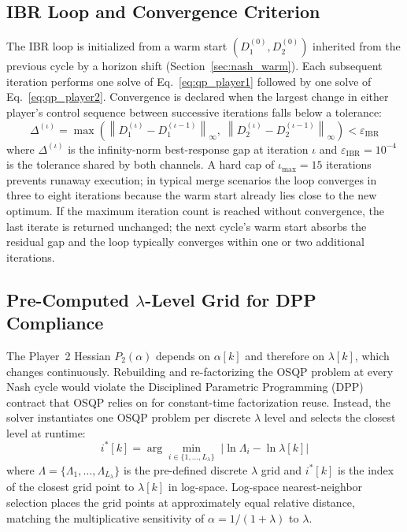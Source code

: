 \documentclass[12pt,a4paper,oneside]{report}
\begin{document}
\subsection{IBR Loop and Convergence Criterion}
\label{sec:ibr_loop}

The IBR loop is initialized from a warm start $(D_1^{(0)}, D_2^{(0)})$ inherited from the previous cycle by a horizon shift (Section~\ref{sec:nash_warm}). Each subsequent iteration performs one solve of Eq.~\eqref{eq:qp_player1} followed by one solve of Eq.~\eqref{eq:qp_player2}. Convergence is declared when the largest change in either player's control sequence between successive iterations falls below a tolerance:
\begin{equation}
\Delta^{(\iota)} = \max\!\left( \left\| D_1^{(\iota)} - D_1^{(\iota-1)} \right\|_{\infty}, \; \left\| D_2^{(\iota)} - D_2^{(\iota-1)} \right\|_{\infty} \right) < \varepsilon_{\text{IBR}}
\label{eq:ibr_convergence}
\end{equation}
where $\Delta^{(\iota)}$ is the infinity-norm best-response gap at iteration $\iota$ and $\varepsilon_{\text{IBR}} = 10^{-4}$ is the tolerance shared by both channels. A hard cap of $\iota_{\max} = 15$ iterations prevents runaway execution; in typical merge scenarios the loop converges in three to eight iterations because the warm start already lies close to the new optimum. If the maximum iteration count is reached without convergence, the last iterate is returned unchanged; the next cycle's warm start absorbs the residual gap and the loop typically converges within one or two additional iterations.

\subsection{Pre-Computed $\lambda$-Level Grid for DPP Compliance}
\label{sec:precomputed_grid}

The Player~2 Hessian $P_2(\alpha)$ depends on $\alpha[k]$ and therefore on $\lambda[k]$, which changes continuously. Rebuilding and re-factorizing the OSQP problem at every Nash cycle would violate the Disciplined Parametric Programming (DPP) contract that OSQP relies on for constant-time factorization reuse. Instead, the solver instantiates one OSQP problem per discrete $\lambda$ level and selects the closest level at runtime:
\begin{equation}
i^{*}[k] = \arg\min_{i \in \{1, \ldots, L_\lambda\}} \; \left| \ln \Lambda_i - \ln \lambda[k] \right|
\label{eq:lambda_snap}
\end{equation}
where $\Lambda = \{\Lambda_1, \ldots, \Lambda_{L_\lambda}\}$ is the pre-defined discrete $\lambda$ grid and $i^{*}[k]$ is the index of the closest grid point to $\lambda[k]$ in log-space. Log-space nearest-neighbor selection places the grid points at approximately equal relative distance, matching the multiplicative sensitivity of $\alpha = 1/(1+\lambda)$ to $\lambda$.
\end{document}
